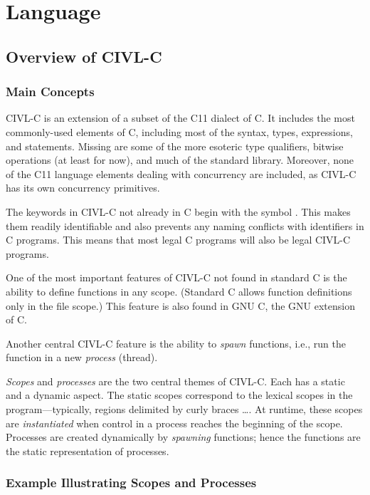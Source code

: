 \part{Language}
\label{part:lang}

\chapter{Overview of CIVL-C}

\section{Main Concepts}

CIVL-C is an extension of a subset of the C11 dialect of C. It
includes the most commonly-used elements of C, including most of the
syntax, types, expressions, and statements. Missing are some of the
more esoteric type qualifiers, bitwise operations (at least for now),
and much of the standard library.  Moreover, none of the C11 language
elements dealing with concurrency are included, as CIVL-C has its own
concurrency primitives.

The keywords in CIVL-C not already in C begin with the symbol \cckey.
This makes them readily identifiable and also prevents any naming
conflicts with identifiers in C programs.  This means that most legal
C programs will also be legal CIVL-C programs.

One of the most important features of CIVL-C not found in standard C
is the ability to define functions in any scope. (Standard C allows
function definitions only in the file scope.)  This feature is also
found in GNU C, the GNU extension of C.

Another central CIVL-C feature is the ability to \emph{spawn}
functions, i.e., run the function in a new \emph{process} (thread).

\emph{Scopes} and \emph{processes} are the two central themes of
CIVL-C.  Each has a static and a dynamic aspect.  The static scopes
correspond to the lexical scopes in the program---typically, regions
delimited by curly braces \lb \ldots \rb.  At runtime, these scopes
are \emph{instantiated} when control in a process reaches the
beginning of the scope.  Processes are created dynamically by
\emph{spawning} functions; hence the functions are the static
representation of processes.

\section{Example Illustrating Scopes and Processes}

